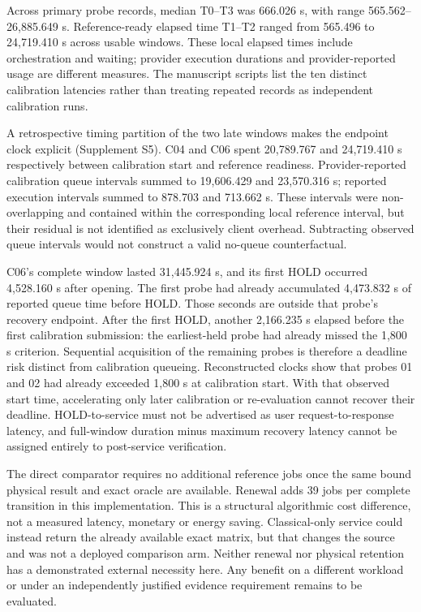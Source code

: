\documentclass[pdflatex,sn-mathphys-num]{sn-jnl}
\begin{document}
Across primary probe records, median T0--T3 was 666.026 s, with range 565.562--26,885.649 s. Reference-ready elapsed time T1--T2 ranged from 565.496 to 24,719.410 s across usable windows. These local elapsed times include orchestration and waiting; provider execution durations and provider-reported usage are different measures. The manuscript scripts list the ten distinct calibration latencies rather than treating repeated records as independent calibration runs.

A retrospective timing partition of the two late windows makes the endpoint clock explicit (Supplement S5). C04 and C06 spent 20,789.767 and 24,719.410 s respectively between calibration start and reference readiness. Provider-reported calibration queue intervals summed to 19,606.429 and 23,570.316 s; reported execution intervals summed to 878.703 and 713.662 s. These intervals were non-overlapping and contained within the corresponding local reference interval, but their residual is not identified as exclusively client overhead. Subtracting observed queue intervals would not construct a valid no-queue counterfactual.

C06's complete window lasted 31,445.924 s, and its first HOLD occurred 4,528.160 s after opening. The first probe had already accumulated 4,473.832 s of reported queue time before HOLD. Those seconds are outside that probe's recovery endpoint. After the first HOLD, another 2,166.235 s elapsed before the first calibration submission: the earliest-held probe had already missed the 1,800 s criterion. Sequential acquisition of the remaining probes is therefore a deadline risk distinct from calibration queueing. Reconstructed clocks show that probes 01 and 02 had already exceeded 1,800 s at calibration start. With that observed start time, accelerating only later calibration or re-evaluation cannot recover their deadline. HOLD-to-service must not be advertised as user request-to-response latency, and full-window duration minus maximum recovery latency cannot be assigned entirely to post-service verification.

The direct comparator requires no additional reference jobs once the same bound physical result and exact oracle are available. Renewal adds 39 jobs per complete transition in this implementation. This is a structural algorithmic cost difference, not a measured latency, monetary or energy saving. Classical-only service could instead return the already available exact matrix, but that changes the source and was not a deployed comparison arm. Neither renewal nor physical retention has a demonstrated external necessity here. Any benefit on a different workload or under an independently justified evidence requirement remains to be evaluated.
\end{document}
